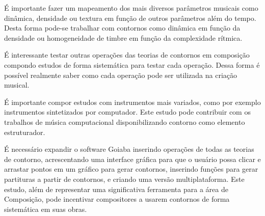 É importante fazer um mapeamento dos mais diversos parâmetros musicais
como dinâmica, densidade ou textura em função de outros parâmetros
além do tempo. Desta forma pode-se trabalhar com contornos como
dinâmica em função da densidade ou homogeneidade de timbre em função
da complexidade rítmica.


É interessante testar outras operações das teorias de contornos em
composição compondo estudos de forma sistemática para testar cada
operação. Dessa forma é possível realmente saber como cada operação
pode ser utilizada na criação musical.

É importante compor estudos com instrumentos mais variados, como por
exemplo instrumentos sintetizados por computador. Este estudo pode
contribuir com os trabalhos de música computacional disponibilizando
contorno como elemento estruturador.


É necessário expandir o software Goiaba inserindo operações de todas
as teorias de contorno, acrescentando uma interface gráfica para que o
usuário possa clicar e arrastar pontos em um gráfico para gerar
contornos, inserindo funções para gerar partituras a partir de
contornos, e criando uma versão multiplataforma. Este estudo, além de
representar uma significativa ferramenta para a área de Composição,
pode incentivar compositores a usarem contornos de forma sistemática
em suas obras.
